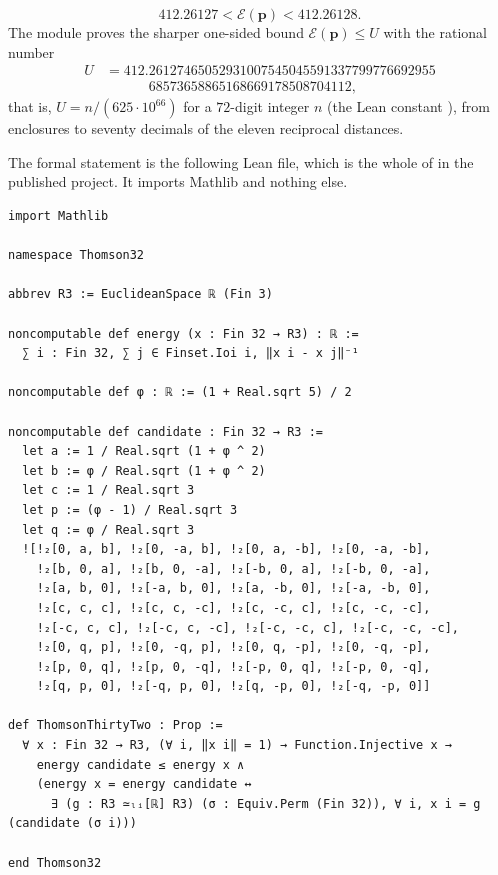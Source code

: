 \documentclass[11pt]{amsart}
\theoremstyle{definition}
\theoremstyle{remark}
\newcommand{\E}{\mathcal{E}}
\newcommand{\cand}{\mathbf{p}}
\begin{document}
\begin{equation}\label{eq:enclosure}
  412.26127<\E(\cand)<412.26128 .
\end{equation}
The module  proves the sharper one-sided bound $\E(\cand)\le U$ with the rational number
\begin{equation}\label{eq:U}
\begin{split}
  U&=412.26127465052931007545045591337799776692955\\
   &\phantom{=412.}68573658865168669178508704112,
\end{split}
\end{equation}
that is, $U=n/(625\cdot10^{66})$ for a $72$-digit integer $n$ (the Lean constant ), from enclosures to seventy decimals of the eleven reciprocal distances.

The formal statement is the following Lean file, which is the whole of  in the published project. It imports Mathlib \cite{Mathlib2020} and nothing else.

\begin{lstlisting}
import Mathlib

namespace Thomson32

abbrev R3 := EuclideanSpace ℝ (Fin 3)

noncomputable def energy (x : Fin 32 → R3) : ℝ :=
  ∑ i : Fin 32, ∑ j ∈ Finset.Ioi i, ‖x i - x j‖⁻¹

noncomputable def φ : ℝ := (1 + Real.sqrt 5) / 2

noncomputable def candidate : Fin 32 → R3 :=
  let a := 1 / Real.sqrt (1 + φ ^ 2)
  let b := φ / Real.sqrt (1 + φ ^ 2)
  let c := 1 / Real.sqrt 3
  let p := (φ - 1) / Real.sqrt 3
  let q := φ / Real.sqrt 3
  ![!₂[0, a, b], !₂[0, -a, b], !₂[0, a, -b], !₂[0, -a, -b],
    !₂[b, 0, a], !₂[b, 0, -a], !₂[-b, 0, a], !₂[-b, 0, -a],
    !₂[a, b, 0], !₂[-a, b, 0], !₂[a, -b, 0], !₂[-a, -b, 0],
    !₂[c, c, c], !₂[c, c, -c], !₂[c, -c, c], !₂[c, -c, -c],
    !₂[-c, c, c], !₂[-c, c, -c], !₂[-c, -c, c], !₂[-c, -c, -c],
    !₂[0, q, p], !₂[0, -q, p], !₂[0, q, -p], !₂[0, -q, -p],
    !₂[p, 0, q], !₂[p, 0, -q], !₂[-p, 0, q], !₂[-p, 0, -q],
    !₂[q, p, 0], !₂[-q, p, 0], !₂[q, -p, 0], !₂[-q, -p, 0]]

def ThomsonThirtyTwo : Prop :=
  ∀ x : Fin 32 → R3, (∀ i, ‖x i‖ = 1) → Function.Injective x →
    energy candidate ≤ energy x ∧
    (energy x = energy candidate ↔
      ∃ (g : R3 ≃ₗᵢ[ℝ] R3) (σ : Equiv.Perm (Fin 32)), ∀ i, x i = g (candidate (σ i)))

end Thomson32
\end{lstlisting}
\end{document}
